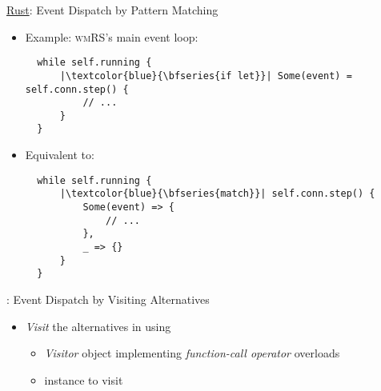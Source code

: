 \begin{frame}[fragile]{\underline{Rust}: Event Dispatch by Pattern Matching \hfill {\footnotesize \currentname}}


    \begin{itemize}

        \item Example: \textsc{wmRS}'s main event loop:\\
\begin{verbatim}
  while self.running {
      |\textcolor{blue}{\bfseries{if let}}| Some(event) = self.conn.step() {
          // ...
      }
  }
\end{verbatim}

        \item Equivalent to:\\
\begin{verbatim}
  while self.running {
      |\textcolor{blue}{\bfseries{match}}| self.conn.step() {
          Some(event) => {
              // ...
          },
          _ => {}
      }
  }
\end{verbatim}

    \end{itemize}

    \vfill

\end{frame}

\begin{frame}[fragile]{\underline{\cpp}: Event Dispatch by Visiting Alternatives \hfill {\footnotesize \currentname}}


    \begin{itemize}

        \item \textit{Visit} the alternatives in  using 
    \begin{itemize}
        \item \textit{Visitor} object implementing \textit{function-call operator} overloads
        \item {} instance to visit
    \end{itemize}


    \end{itemize}

    \vfill

\end{frame}

